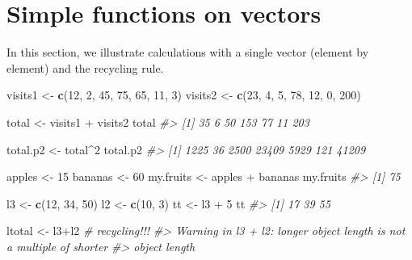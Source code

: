 \documentclass[]{book}
\newenvironment{Shaded}{}{}
\newcommand{\CommentTok}[1]{\textcolor[rgb]{0.38,0.63,0.69}{\textit{#1}}}
\newcommand{\DecValTok}[1]{\textcolor[rgb]{0.25,0.63,0.44}{#1}}
\newcommand{\KeywordTok}[1]{\textcolor[rgb]{0.00,0.44,0.13}{\textbf{#1}}}
\newcommand{\NormalTok}[1]{#1}
\newcommand{\OperatorTok}[1]{\textcolor[rgb]{0.40,0.40,0.40}{#1}}
\newcommand{\StringTok}[1]{\textcolor[rgb]{0.25,0.44,0.63}{#1}}
\theoremstyle{definition}
\theoremstyle{definition}
\theoremstyle{definition}
\theoremstyle{remark}
\begin{document}
\hypertarget{simple-functions-on-vectors}{%
\chapter{Simple functions on
vectors}\label{simple-functions-on-vectors}}

In this section, we illustrate calculations with a single vector
(element by element) and the recycling rule.

\begin{Shaded}
\begin{Highlighting}[]
\NormalTok{visits1 <-}\StringTok{  }\KeywordTok{c}\NormalTok{(}\DecValTok{12}\NormalTok{, }\DecValTok{2}\NormalTok{, }\DecValTok{45}\NormalTok{, }\DecValTok{75}\NormalTok{, }\DecValTok{65}\NormalTok{, }\DecValTok{11}\NormalTok{, }\DecValTok{3}\NormalTok{)}
\NormalTok{visits2 <-}\StringTok{ }\KeywordTok{c}\NormalTok{(}\DecValTok{23}\NormalTok{, }\DecValTok{4}\NormalTok{, }\DecValTok{5}\NormalTok{, }\DecValTok{78}\NormalTok{, }\DecValTok{12}\NormalTok{, }\DecValTok{0}\NormalTok{, }\DecValTok{200}\NormalTok{)}

\NormalTok{total <-}\StringTok{ }\NormalTok{visits1 }\OperatorTok{+}\StringTok{ }\NormalTok{visits2}
\NormalTok{total}
\CommentTok{#> [1]  35   6  50 153  77  11 203}

\NormalTok{total.p2 <-}\StringTok{ }\NormalTok{total}\OperatorTok{^}\DecValTok{2}
\NormalTok{total.p2}
\CommentTok{#> [1]  1225    36  2500 23409  5929   121 41209}

\NormalTok{apples <-}\StringTok{ }\DecValTok{15}
\NormalTok{bananas <-}\StringTok{ }\DecValTok{60}
\NormalTok{my.fruits <-}\StringTok{ }\NormalTok{apples }\OperatorTok{+}\StringTok{ }\NormalTok{bananas}
\NormalTok{my.fruits}
\CommentTok{#> [1] 75}

\NormalTok{l3 <-}\StringTok{ }\KeywordTok{c}\NormalTok{(}\DecValTok{12}\NormalTok{, }\DecValTok{34}\NormalTok{, }\DecValTok{50}\NormalTok{)}
\NormalTok{l2 <-}\StringTok{ }\KeywordTok{c}\NormalTok{(}\DecValTok{10}\NormalTok{, }\DecValTok{3}\NormalTok{)}
\NormalTok{tt <-}\StringTok{ }\NormalTok{l3 }\OperatorTok{+}\StringTok{ }\DecValTok{5} 
\NormalTok{tt}
\CommentTok{#> [1] 17 39 55}

\NormalTok{ltotal <-}\StringTok{ }\NormalTok{l3}\OperatorTok{+}\NormalTok{l2 }\CommentTok{# recycling!!!}
\CommentTok{#> Warning in l3 + l2: longer object length is not a multiple of shorter}
\CommentTok{#> object length}
\end{Highlighting}
\end{Shaded}
\end{document}
